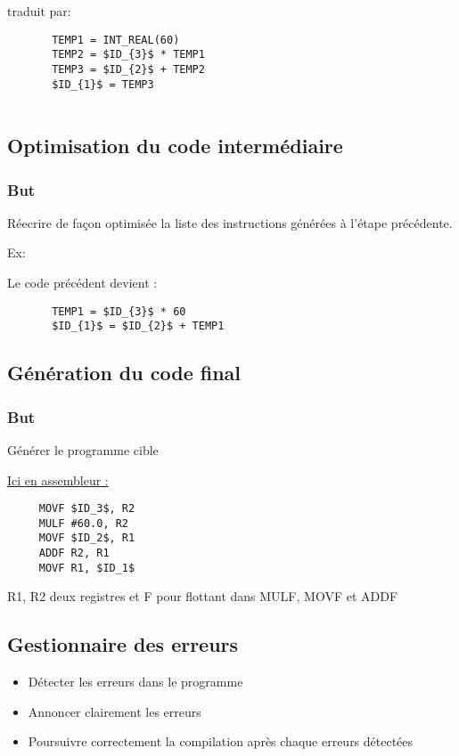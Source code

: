 \documentclass[a4paper,10pt]{report}
\begin{document}
      traduit par:
      
      \begin{lstlisting}
       TEMP1 = INT_REAL(60)
       TEMP2 = $ID_{3}$ * TEMP1
       TEMP3 = $ID_{2}$ + TEMP2
       $ID_{1}$ = TEMP3
       
      \end{lstlisting}


      \subsection{Optimisation du code intermédiaire}
      \subsubsection{But}
      Réecrire de façon optimisée la liste des instructions générées à l'étape précédente.
      
      Ex:
      
      Le code précédent devient :
      
      \begin{lstlisting}
       TEMP1 = $ID_{3}$ * 60
       $ID_{1}$ = $ID_{2}$ + TEMP1
      \end{lstlisting}

    \subsection{Génération du code final}
    \subsubsection{But}
    Générer le programme cible
    
    \underline{Ici en assembleur :}
    
    \begin{lstlisting}
     MOVF $ID_3$, R2
     MULF #60.0, R2
     MOVF $ID_2$, R1
     ADDF R2, R1
     MOVF R1, $ID_1$
    \end{lstlisting}
    
    R1, R2 deux registres et F pour flottant dans MULF, MOVF et ADDF
    
    \subsection{Gestionnaire des erreurs}
    \begin{itemize}
     \item Détecter les erreurs dans le programme
     \item Annoncer clairement les erreurs
     \item Poursuivre correctement la compilation après chaque erreurs détectées
    \end{itemize}
\end{document}
